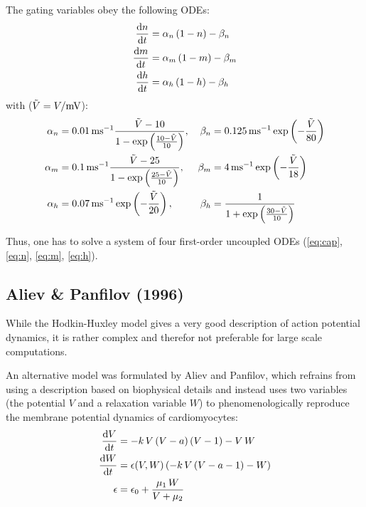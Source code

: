The gating variables obey the following ODEs:
\begin{subequations}
\begin{align}
    \dv{n}{t}&=\alpha_{n}\,(1-n)-\beta_{n} \label{eq:n} \\
    \dv{m}{t}&=\alpha_{m}\,(1-m)-\beta_{m} \label{eq:m} \\
    \dv{h}{t}&=\alpha_{h}\,(1-h)-\beta_{h} \label{eq:h}
\end{align}
\end{subequations}
with ($\tilde{V}=V/\si{\milli\volt}$):
\begin{align*}
    \alpha_{n}&=\SI{.01}{\per\milli\second}
        \frac{\tilde{V}-10}{1-
            \exp\left(\frac{10-\tilde{V}}{10}\right)},&
    \beta_{n}&=\SI{.125}{\per\milli\second}
        \exp\left(-\frac{\tilde{V}}{80}\right) \\
    \alpha_{m}&=\SI{.1}{\per\milli\second}
        \frac{\tilde{V}-25}{1-
            \exp\left(\frac{25-\tilde{V}}{10}\right)},&
    \beta_{m}&=\SI{4}{\per\milli\second}
        \exp\left(-\frac{\tilde{V}}{18}\right) \\
    \alpha_{h}&=\SI{.07}{\per\milli\second}
        \exp\left(-\frac{\tilde{V}}{20}\right),&
    \beta_{h}&=\frac{1}{1+
        \exp\left(\frac{30-\tilde{V}}{10}\right)}
\end{align*}

Thus, one has to solve a system of four first-order uncoupled ODEs
(\ref{eq:cap}, \ref{eq:n}, \ref{eq:m}, \ref{eq:h}).


\subsection{Aliev \& Panfilov (1996)}
While the Hodkin-Huxley model gives a very good description of
action potential dynamics, it is rather complex and therefor not preferable
for large scale computations.

An alternative model was formulated by Aliev and Panfilov, which refrains
from using a description based on biophysical details and instead uses two
variables (the potential $V$ and a relaxation variable $W$) to
phenomenologically reproduce the membrane potential dynamics of
cardiomyocytes:
\begin{subequations}
\begin{align}
    \dv{V}{t}&=-k\,V\,(V-a)\,(V-1)-V\,W \label{eq:ap_pot} \\
    \dv{W}{t}&=\epsilon(V, W)\,(-k\,V\,(V-a-1)-W) \label{eq:ap_relax} \\
    \epsilon&=\epsilon_0+\frac{\mu_1\,W}{V+\mu_2} \nonumber
\end{align}
\end{subequations}

